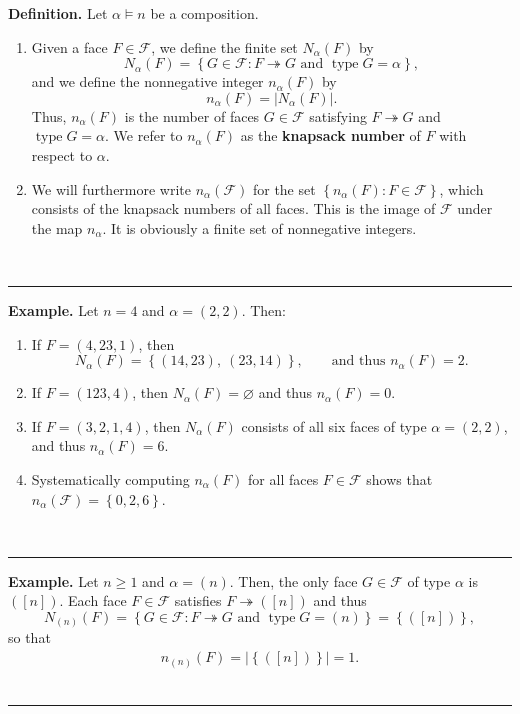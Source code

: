 \documentclass[12pt]{article}
\theoremstyle{definition}%
\theoremstyle{definition}%
\newtheorem{defn}[thm]{Definition}
\newtheorem{exmp}[thm]{Example}
\theoremstyle{remark}%
\newcommand{\tup}[1]{\left( #1 \right)}
\newcommand{\interval}[1]{\left[ #1 \right]} %
\newcommand{\set}[1]{\left\{ #1 \right\}}
\newcommand{\card}[1]{\left| #1 \right|} %
\newcommand{\CF}{\mathcal{F}}
\newcommand{\na}{n_{ \alpha } }%
\newcommand{\Na}{N_{ \alpha } }%
\newcommand{\type}{\operatorname{type}}
\newcommand{\con}{\twoheadrightarrow} %
\newcommand{\defin}[1]{\textbf{#1}}
\newenvironment{defn}[1][Definition]{\noindent\textbf{#1.} }{\ \rule{0.5em}{0.5em}}
\newenvironment{exmp}[1][Example]{\noindent\textbf{#1.} }{\ \rule{0.5em}{0.5em}}
\begin{document}
\begin{defn}
    \label{knap_num_def}
    Let $\alpha \models n$ be a composition.
	
	\begin{enumerate}
	
	\item[\textbf{(a)}] Given a face $F \in \CF$, we define the finite set $\Na\tup{F}$ by
	\[
    \Na\tup{F} = \set{G \in \CF  : F \con G \text{ and } \type G = \alpha},
    \]
    and we define the nonnegative integer $\na\tup{F}$ by
    \[
    \na\tup{F} = \card{\Na\tup{F}}.
    \]
	Thus, $\na\tup{F}$ is the number of faces $G \in \CF$ satisfying $F \con G$ and $\type G = \alpha$.
    We refer to $\na\tup{F}$ as the \defin{knapsack number} of $F$ with respect to $\alpha$.

	\item[\textbf{(b)}]
	We will furthermore write $\na\tup{\CF}$ for the set
	$\set{\na\tup{F} : F \in \CF}$, which consists
	of the knapsack numbers of all faces.
	This is the image of $ \CF $ under the map $\na$.
	It is obviously a finite set of nonnegative integers.
	
	\end{enumerate}
\end{defn}

\begin{exmp}
Let $n = 4$ and $\alpha = \tup{2,2}$. Then:
\begin{enumerate}
\item If $F = \tup{4,23,1}$, then
\[
\Na\tup{F} = \set{\tup{14,23}, \ \tup{23,14}}, \qquad \text{and thus }
\na\tup{F} = 2.
\]
\item If $F = \tup{123,4}$, then $\Na\tup{F} = \varnothing$ and thus $\na\tup{F} = 0$.
\item If $F = \tup{3,2,1,4}$, then $\Na\tup{F}$ consists of all six faces of type $\alpha = \tup{2,2}$, and thus $\na\tup{F} = 6$.
\item Systematically computing $\na\tup{F}$ for all faces $F \in \CF$ shows that $\na\tup{\CF} = \set{0, 2, 6}$.
\end{enumerate}
\end{exmp}

\begin{exmp}
\label{exa.knap_num_min}
Let $n \geq 1$ and $\alpha = \tup{n}$.
Then, the only face $G \in \CF$ of type $\alpha$ is $\tup{\interval{n}}$.
Each face $F \in \CF$ satisfies $F \con \tup{\interval{n}}$
and thus
\[
N_{\tup{n}}\tup{F}
= \set{G \in \CF  : F \con G \text{ and } \type G = \tup{n}}
= \set{\tup{\interval{n}}},
\]
so that
\begin{align}
n_{\tup{n}}\tup{F} = \card{\set{\tup{\interval{n}}}} = 1.
\label{eq.exa.knap_num_min.n}
\end{align}
\end{exmp}
\end{document}
